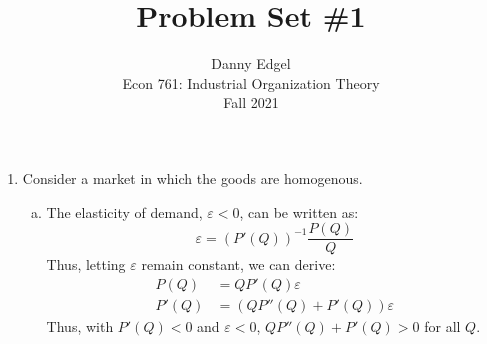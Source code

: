 \documentclass{article}
\begin{document}
\title{	Problem Set \#1 }
\author{ 		Danny Edgel 						\\ 
			Econ 761: Industrial Organization Theory	\\
			Fall 2021						\\
		}
\maketitle\thispagestyle{empty}



\begin{enumerate}
	\item Consider a market in which the goods are homogenous.
		\begin{enumerate}[(a)]
			\item The elasticity of demand, $\varepsilon<0$, can be written as: 
                \[ \varepsilon = \left(P'(Q)\right)^{-1}\frac{P(Q)}{Q} \]
				Thus, letting $\varepsilon$ remain constant, we can derive:
				\begin{align*}
					P(Q)	&= QP'(Q)\varepsilon				\\
					P'(Q)	&= \left(QP''(Q) + P'(Q)\right)\varepsilon
				\end{align*}
				Thus, with $P'(Q)<0$ and $\varepsilon<0$, ${QP''(Q) + P'(Q)>0}$ for all $Q$.


\end{enumerate}
\end{enumerate}
\end{document}
